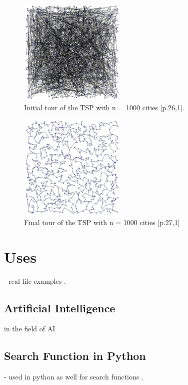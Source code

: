 \documentclass[conference]{IEEEtran}
\begin{document}
\begin{figure}[H]
\centerline{\includegraphics[width=0.45\textwidth,height=0.45\textheight,keepaspectratio]{fig5.png}}
\caption{Initial tour of the TSP with n = 1000 cities [p.26,1].}
\end{figure}

\begin{figure}[H]
\centerline{\includegraphics[width=0.45\textwidth,height=0.45\textheight,keepaspectratio]{fig6.png}}
\caption{Final tour of the TSP with n = 1000 cities [p.27,1]}
\end{figure}



\section{Uses}

- real-life examples \cite{b8}.

\subsection{Artificial Intelligence}
in the field of AI \cite{b9}

\subsection{Search Function in Python}
- used in python as well for search functions \cite{b10}.
\end{document}
